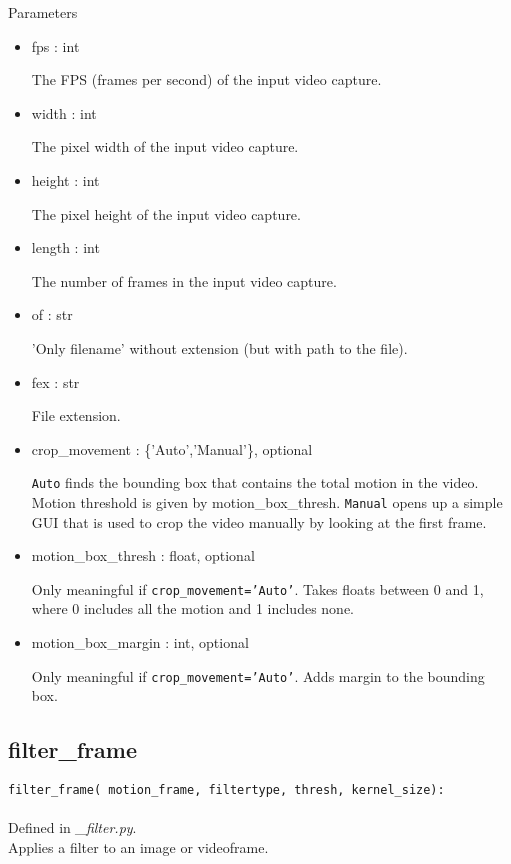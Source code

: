 \documentclass[9pt]{extarticle}
\def\code#1{\texttt{#1}}
\begin{document}
\noindent Parameters
\begin{itemize}
\item fps : int

The FPS (frames per second) of the input video capture.

\item width : int

The pixel width of the input video capture. 

\item height : int

The pixel height of the input video capture. 

\item length : int

The number of frames in the input video capture.

\item of : str

'Only filename' without extension (but with path to the file).

\item fex : str

File extension.

\item crop\_movement : \{'Auto','Manual'\}, optional

\code{Auto} finds the bounding box that contains the total motion in 
the video. Motion threshold is given by motion\_box\_thresh. \code{Manual} 
opens up a simple GUI that is used to crop the video manually by 
looking at the first frame.

\item motion\_box\_thresh : float, optional

Only meaningful if \code{crop\_movement='Auto'}. Takes floats between 
0 and 1, where 0 includes all the motion and 1 includes none.

\item motion\_box\_margin : int, optional

Only meaningful if \code{crop\_movement='Auto'}. Adds margin to 
the bounding box.
\end{itemize}


\subsection{filter\_frame}

\code{filter\_frame(
    motion\_frame, 
    filtertype, 
    thresh, 
    kernel\_size):}
\\\\
Defined in \textit{\_filter.py}.\\
Applies a filter to an image or videoframe.
\\\\
\end{document}
